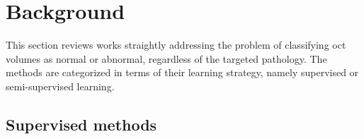\graphicspath{ {./content/method/figures/} }
\section{Background}\label{sec:review}
This section reviews works straightly addressing the problem of classifying \gls{oct} volumes as normal or abnormal, regardless of the targeted pathology.
The methods are categorized in terms of their learning strategy, namely supervised or semi-supervised learning.


\subsection{Supervised methods}



